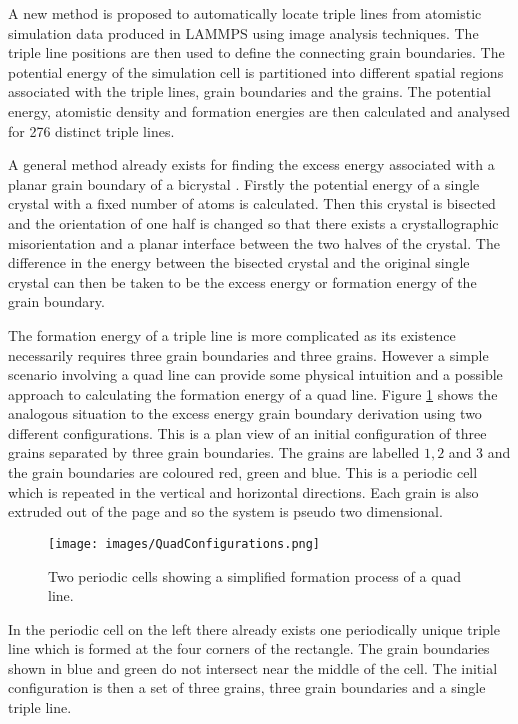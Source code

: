 \documentclass[12pt,a4paper,openany]{report}
\begin{document}
A new method is proposed to automatically locate triple lines from atomistic simulation data produced in LAMMPS using image analysis techniques. The triple line positions are then used to define the connecting grain boundaries. The potential energy of the simulation cell is partitioned into different spatial regions associated with the triple lines, grain boundaries and the grains. The potential energy, atomistic density and formation energies are then calculated and analysed for 276 distinct triple lines.

A general method already exists for finding the excess energy associated with a planar grain boundary of a bicrystal \cite{Han2018}. Firstly the potential energy of a single crystal with a fixed number of atoms is calculated. Then this crystal is bisected and the orientation of one half is changed so that there exists a crystallographic misorientation and a planar interface between the two halves of the crystal. The difference in the energy between the bisected crystal and the original single crystal can then be taken to be the excess energy or formation energy of the grain boundary.

The formation energy of a triple line is more complicated as its existence necessarily requires three grain boundaries and three grains. However a simple scenario involving a quad line can provide some physical intuition and a possible approach to calculating the formation energy of a quad line. Figure \ref{fig:Quad} shows the analogous situation to the excess energy grain boundary derivation using two different configurations. This is a plan view of an initial configuration of three grains separated by three grain boundaries. The grains are labelled $1, 2$ and $3$ and the grain boundaries are coloured red, green and blue. This is a periodic cell which is repeated in the vertical and horizontal directions. Each grain is also extruded out of the page and so the system is pseudo two dimensional.

\begin{figure}[H]
	\centering
	\texttt{[image: images/QuadConfigurations.png]} 
	\caption{Two periodic cells showing a simplified formation process of a quad line.}
	\label{fig:Quad}
\end{figure}
 
In the periodic cell on the left there already exists one periodically unique triple line which is formed at the four corners of the rectangle. The grain boundaries shown in blue and green do not intersect near the middle of the cell. The initial configuration is then a set of three grains, three grain boundaries and a single triple line.
\end{document}
